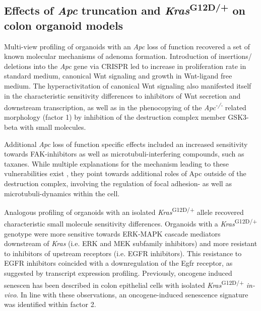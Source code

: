 \begin{flushleft}
\subsection{Effects of \textit{Apc} truncation and \textit{Kras}\textsuperscript{G12D/+} on colon organoid models}

Multi-view profiling of organoids with an \textit{Apc} loss of function recovered a set of known molecular mechanisms of adenoma formation. Introduction of insertions/ deletions into the \textit{Apc} gene via CRISPR led to increase in proliferation rate in standard medium, canonical Wnt signaling and growth in Wnt-ligand free medium. The hyperactivitation of canonical Wnt signaling also manifested itself in the characteristic sensitivity differences to inhibitors of Wnt secretion and downstream transcription, as well as in the phenocopying of the \textit{Apc\textsuperscript{-/-}} related morphology (factor 1) by inhibition of the destruction complex member GSK3-beta with small molecules.
\par

Additional \textit{Apc} loss of function specific effects included an increased sensitivity towards FAK-inhibitors as well as microtubuli-interfering compounds, such as taxanes. While multiple explanations for the mechanism leading to these vulnerabilities exist \parencite{ashtonFocalAdhesionKinase2010}, they point towards additional roles of Apc outside of the destruction complex, involving the regulation of focal adhesion- \parencite{ashtonFocalAdhesionKinase2010, matsumotoBindingAPCDishevelled2010} as well as microtubuli-dynamics \parencite{stolzWntMediatedProtein2015} within the cell.
\par

Analogous profiling of organoids with an isolated \textit{Kras}\textsuperscript{G12D/+} allele recovered characteristic small molecule sensitivity differences. Organoids with a \textit{Kras}\textsuperscript{G12D/+} genotype were more sensitive towards ERK-MAPK cascade mediators downstream of \textit{Kras} (i.e. ERK and MEK subfamily inhibitors) and more resistant to inhibitors of upstream receptors (i.e. EGFR inhibitors). This resistance to EGFR inhibitors coincided with a downregulation of the Egfr receptor, as suggested by transcript expression profiling. Previously, oncogene induced senescen has been described in colon epithelial cells with isolated \textit{Kras}\textsuperscript{G12D/+} \parencite{benneckeInk4aArfOncogeneinduced2010} \textit{in-vivo}. In line with these observations, an oncogene-induced senescence signature was identified within factor 2.
\par


\end{flushleft}
